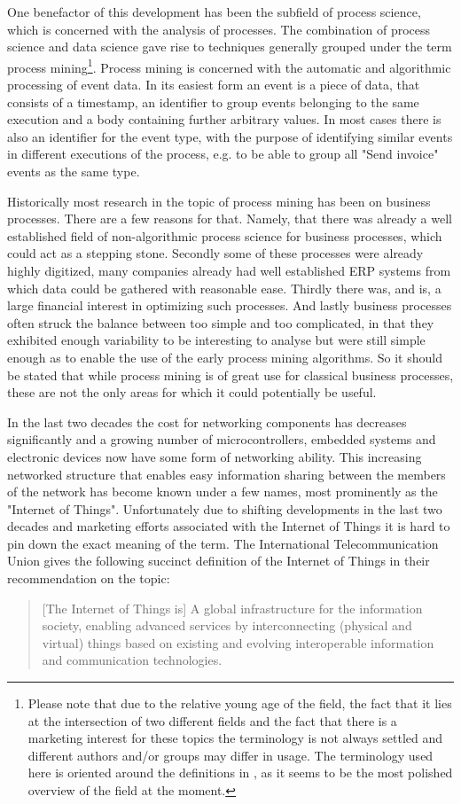 \documentclass[runningheads]{template/llncs}
\begin{document}
One benefactor of this development has been the subfield of process science, which is concerned with the analysis of processes.
The combination of process science and data science gave rise to techniques generally grouped under the term process mining\footnote{Please note that due to the relative young age of the field, the fact that it lies at the intersection of two different fields and the fact that there is a marketing interest for these topics the terminology is not always settled and different authors and/or groups may differ in usage. The terminology used here is oriented around the definitions in \cite{Aals16}, as it seems to be the most polished overview of the field at the moment.}.
Process mining is concerned with the automatic and algorithmic processing of event data. In its easiest form an event is a piece of data, that consists of a timestamp, an identifier to group events belonging to the same execution and a body containing further arbitrary values.
In most cases there is also an identifier for the event type, with the purpose of identifying similar events in different executions of the process, e.g. to be able to group all "Send invoice" events as the same type.

Historically most research in the topic of process mining has been on business processes. 
There are a few reasons for that. 
Namely, that there was already a well established field of non-algorithmic process science for business processes, which could act as a stepping stone.
Secondly some of these processes were already highly digitized, many companies already had well established ERP systems from which data could be gathered with reasonable ease.
Thirdly there was, and is, a large financial interest in optimizing such processes.
And lastly business processes often struck the balance between too simple and too complicated, in that they exhibited enough variability to be interesting to analyse but were still simple enough as to enable the use of the early process mining algorithms.
So it should be stated that while process mining is of great use for classical business processes, these are not the only areas for which it could potentially be useful.

In the last two decades the cost for networking components has decreases significantly and a growing number of microcontrollers, embedded systems and electronic devices now have some form of networking ability.
This increasing networked structure that enables easy information sharing between the members of the network has become known under a few names, most prominently as the "Internet of Things".
Unfortunately due to shifting developments in the last two decades and marketing efforts associated with the Internet of Things it is hard to pin down the exact meaning of the term. 
The International Telecommunication Union gives the following succinct definition of the Internet of Things in their recommendation \cite{ITUT12} on the topic:
\blockquote{[The Internet of Things is] A  global  infrastructure  for  the  information  society,  enabling  advanced  services  by  interconnecting  (physical  and  virtual)  things  based  on  existing  and  evolving  interoperable information and communication technologies.}
\end{document}
